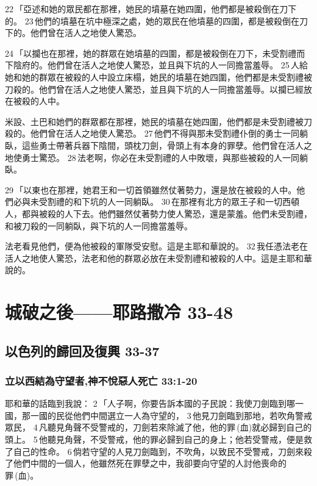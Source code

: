 22 「亞述和她的眾民都在那裡，她民的墳墓在她四圍，他們都是被殺倒在刀下的。 23 他們的墳墓在坑中極深之處，她的眾民在他墳墓的四圍，都是被殺倒在刀下的。他們曾在活人之地使人驚恐。

24 「以攔也在那裡，她的群眾在她墳墓的四圍，都是被殺倒在刀下，未受割禮而下陰府的。他們曾在活人之地使人驚恐，並且與下坑的人一同擔當羞辱。 25 人給她和她的群眾在被殺的人中設立床榻，她民的墳墓在她四圍，他們都是未受割禮被刀殺的。他們曾在活人之地使人驚恐，並且與下坑的人一同擔當羞辱。以攔已經放在被殺的人中。

米設、土巴和她們的群眾都在那裡，她民的墳墓在她四圍，他們都是未受割禮被刀殺的。他們曾在活人之地使人驚恐。 27 他們不得與那未受割禮仆倒的勇士一同躺臥，這些勇士帶著兵器下陰間，頭枕刀劍，骨頭上有本身的罪孽。他們曾在活人之地使勇士驚恐。 28 法老啊，你必在未受割禮的人中敗壞，與那些被殺的人一同躺臥。

29 「以東也在那裡，她君王和一切首領雖然仗著勢力，還是放在被殺的人中。他們必與未受割禮的和下坑的人一同躺臥。 30 在那裡有北方的眾王子和一切西頓人，都與被殺的人下去。他們雖然仗著勢力使人驚恐，還是蒙羞。他們未受割禮，和被刀殺的一同躺臥，與下坑的人一同擔當羞辱。

法老看見他們，便為他被殺的軍隊受安慰。這是主耶和華說的。 32 我任憑法老在活人之地使人驚恐，法老和他的群眾必放在未受割禮和被殺的人中。這是主耶和華說的。

\section{城破之後——耶路撒冷 33-48}
\subsection{以色列的歸回及復興 33-37}
\subsubsection{立以西結為守望者,神不悅惡人死亡 33:1-20}
耶和華的話臨到我說： 2 「人子啊，你要告訴本國的子民說：我使刀劍臨到哪一國，那一國的民從他們中間選立一人為守望的， 3 他見刀劍臨到那地，若吹角警戒眾民， 4 凡聽見角聲不受警戒的，刀劍若來除滅了他，他的罪 (血)就必歸到自己的頭上。 5 他聽見角聲，不受警戒，他的罪必歸到自己的身上；他若受警戒，便是救了自己的性命。 6 倘若守望的人見刀劍臨到，不吹角，以致民不受警戒，刀劍來殺了他們中間的一個人，他雖然死在罪孽之中，我卻要向守望的人討他喪命的罪 (血)。


